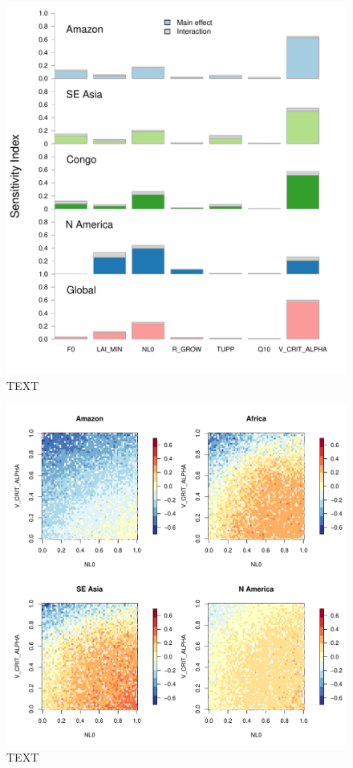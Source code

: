 \documentclass[esd, manuscript]{copernicus}
\begin{document}
\begin{figure}[t]
\includegraphics[width=12cm]{graphics/FAST_histograms.pdf}
\caption{TEXT}
\label{fig:FAST_histograms}
\end{figure}

\begin{figure}[t]
\includegraphics[width=12cm]{graphics/discrepancy_parameter_space.pdf}
\caption{TEXT}
\label{fig:discrepancy_parameter_space}
\end{figure}
\end{document}
